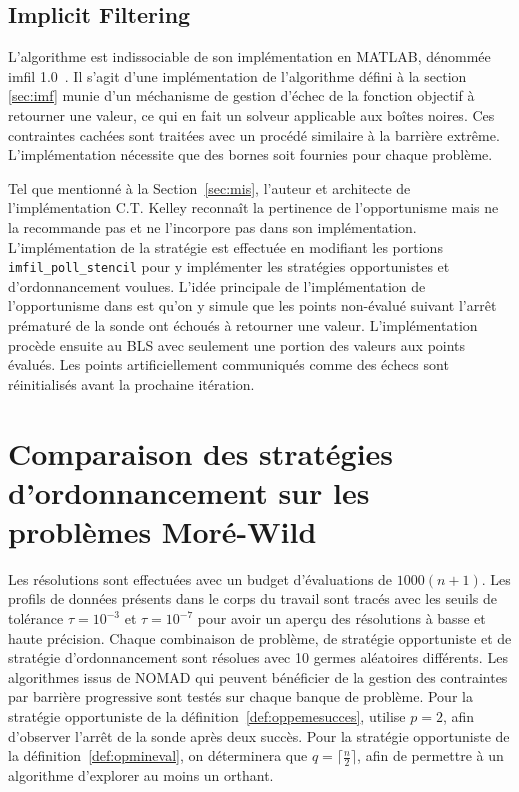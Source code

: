 \subsection{Implicit Filtering}\label{sec:mim}
L'algorithme \imfil est indissociable de son implémentation en MATLAB, dénommée imfil 1.0~\cite{Kelley2011,Kelley2011b}. Il s'agit d'une implémentation de l'algorithme défini à la section \ref{sec:imf} munie d'un méchanisme de gestion d'échec de la fonction objectif à retourner une valeur, ce qui en fait un solveur applicable aux boîtes noires. Ces contraintes cachées sont traitées avec un procédé similaire à la barrière extrême. L'implémentation nécessite que des bornes soit fournies pour chaque problème.

Tel que mentionné à la Section~\ref{sec:mis}, l'auteur et architecte de l'implémentation C.T. Kelley reconnaît la pertinence de l'opportunisme mais ne la recommande pas et ne l'incorpore pas dans son implémentation. L'implémentation de la stratégie est effectuée en modifiant les portions \texttt{imfil\_poll\_stencil} pour y implémenter les stratégies opportunistes et d'ordonnancement voulues. L'idée principale de l'implémentation de l'opportunisme dans \imfil est qu'on y simule que les points non-évalué suivant l'arrêt prématuré de la sonde ont échoués à retourner une valeur. L'implémentation procède ensuite au \textsf{BLS} avec seulement une portion des valeurs aux points évalués. Les points artificiellement communiqués comme des échecs sont réinitialisés avant la prochaine itération.
\section{Comparaison des stratégies d'ordonnancement sur les problèmes Moré-Wild}\label{sec:com}
Les résolutions sont effectuées avec un budget d'évaluations de $1000(n+1)$. Les profils de données présents dans le corps du travail sont tracés avec les seuils de tolérance $\tau = 10^{-3}$ et $\tau = 10^{-7}$ pour avoir un aperçu des résolutions à basse et haute précision. Chaque combinaison de problème, de stratégie opportuniste et de stratégie d'ordonnancement sont résolues avec 10 germes aléatoires différents. Les algorithmes issus de NOMAD qui peuvent bénéficier de la gestion des contraintes par barrière progressive sont testés sur chaque banque de problème. Pour la stratégie opportuniste de la définition~\ref{def:oppemesucces}, utilise $p=2$, afin d'observer l'arrêt de la sonde après deux succès. Pour la stratégie opportuniste de la définition~\ref{def:opmineval}, on déterminera que $q = \lceil\frac{n}{2}\rceil$, afin de permettre à un algorithme d'explorer au moins un orthant.

